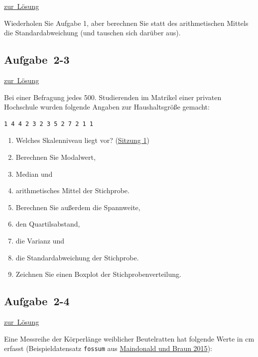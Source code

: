 \documentclass[
  11pt,
  ngerman,
  a4paper,
]{report}
\providecommand{\tightlist}{%
  \setlength{\itemsep}{0pt}\setlength{\parskip}{0pt}}
\begin{document}
\protect\hyperlink{loesung-2-2}{zur~Lösung}

Wiederholen Sie Aufgabe 1, aber berechnen Sie statt des arithmetischen Mittels die Standardabweichung (und tauschen sich darüber aus).

\hypertarget{aufgabe-2-3}{%
\subsection{Aufgabe~2-3}\label{aufgabe-2-3}}

\protect\hyperlink{loesung-2-3}{zur~Lösung}

Bei einer Befragung jedes 500. Studierenden im Matrikel einer privaten Hochschule wurden folgende Angaben zur Haushaltsgröße gemacht:

\begin{verbatim}
1 4 4 2 3 2 3 5 2 7 2 1 1
\end{verbatim}

\begin{enumerate}
\def\labelenumi{\alph{enumi})}
\tightlist
\item
  Welches Skalenniveau liegt vor? (\protect\hyperlink{skalenniveaus}{Sitzung 1})
\item
  Berechnen Sie Modalwert,
\item
  Median und
\item
  arithmetisches Mittel der Stichprobe.
\item
  Berechnen Sie außerdem die Spannweite,
\item
  den Quartilsabstand,
\item
  die Varianz und
\item
  die Standardabweichung der Stichprobe.
\item
  Zeichnen Sie einen Boxplot der Stichprobenverteilung.
\end{enumerate}

\hypertarget{aufgabe-2-4}{%
\subsection{Aufgabe~2-4}\label{aufgabe-2-4}}

\protect\hyperlink{loesung-2-4}{zur~Lösung}

Eine Messreihe der Körperlänge weiblicher Beutelratten hat folgende Werte in cm erfasst (Beispieldatensatz \texttt{fossum} aus \protect\hyperlink{ref-daag}{Maindonald und Braun 2015}):
\end{document}
